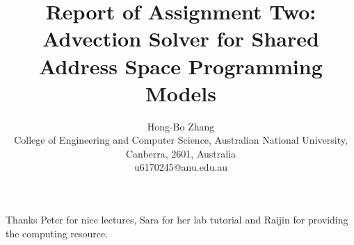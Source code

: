 \documentclass[11pt,assignment]{HONGBOANU}
\title{Report of Assignment Two: Advection Solver for Shared Address Space Programming Models}
\author{Hong-Bo Zhang\\
College of Engineering and Computer Science, Australian National University, Canberra, 2601, Australia\\
u6170245@anu.edu.au}
\begin{document}
\newpage












\acknowledgments
Thanks Peter for nice lectures, Sara for her lab tutorial and  Raijin for providing the computing resource.

\appendix


\begin{thebibliography}{999}
\end{thebibliography}
\end{document}
